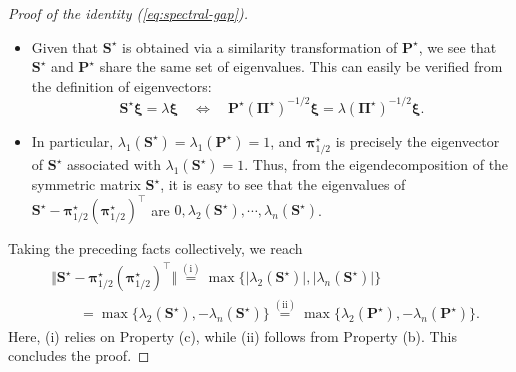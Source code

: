 \begin{proof}[Proof of the identity (\ref{eq:spectral-gap})]
\begin{itemize}
	\item[(b)] Given that $\bm{S}^{\star}$ is obtained via a similarity transformation of $\bm{P}^{\star}$,
		we see that $\bm{S}^{\star}$ and $\bm{P}^{\star}$ share the same set of eigenvalues.
		This can easily be verified from the definition of eigenvectors:
	$$
	   \bm{S}^{\star} \bm{\xi} = \lambda \bm{\xi}  \quad \Longleftrightarrow \quad
	   \bm{P}^{\star}\left(\bm{\Pi}^{\star}\right)^{-1/2} \bm{\xi} = \lambda \left(\bm{\Pi}^{\star}\right)^{-1/2}  \bm{\xi}.
	$$
	\item[(c)] In particular, $\lambda_{1}(\bm{S}^{\star})=\lambda_{1}(\bm{P}^{\star})=1$,
		and  $\bm{\pi}^{\star}_{1/2}$ is precisely the eigenvector of $\bm{S}^{\star}$ associated with  $\lambda_{1}(\bm{S}^{\star})=1$.
		Thus, from the eigendecomposition of the symmetric matrix $\bm{S}^{\star}$,
		it is easy to see that the eigenvalues of $\bm{S}^{\star} - \bm{\pi}^{\star}_{1/2}(\bm{\pi}^{\star}_{1/2})^{\top}$ are $0,
	\lambda_{2}(\bm{S}^{\star}), \cdots, \lambda_{n}(\bm{S}^{\star})$.
\end{itemize}
%
Taking the preceding facts collectively, we reach
%
\begin{align*}
	& \big\Vert \bm{S}^{\star} - \bm{\pi}^{\star}_{1/2}(\bm{\pi}^{\star}_{1/2})^{\top} \big\Vert
	\overset{(\mathrm{i})}{=} \max \big\{ \big| \lambda_{2}(\bm{S}^{\star}) \big|, \big| \lambda_{n}(\bm{S}^{\star}) \big| \big\}  \\
	& \qquad = \max \big\{ \lambda_{2}(\bm{S}^{\star}),-\lambda_{n}(\bm{S}^{\star}) \big\}
	 \overset{\mathrm{(ii)}}{=}\max\big\{ \lambda_{2}(\bm{P}^{\star}),-\lambda_{n}(\bm{P}^{\star}) \big\} .
\end{align*}
%
Here, (i) relies on Property (c), while (ii) follows from Property (b). This concludes the proof. \end{proof}

